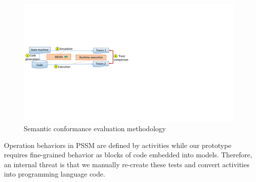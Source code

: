 \begin{figure}
	\centering
	\includegraphics[clip, trim=0.2cm 8.6cm 16.7cm 6.9cm, width=\columnwidth]{figures/semanticconformance.pdf}
	\caption{Semantic conformance evaluation methodology} 
	\label{fig:semanticconformance}
\end{figure}		

\vskip 0.1cm
\noindent
{}
Operation behaviors in PSSM are defined by activities while our prototype requires fine-grained behavior as blocks of code embedded into models.
Therefore, an internal threat is that we manually re-create these tests and convert activities into programming language code.




